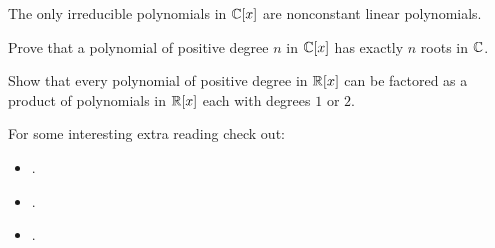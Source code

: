 \documentclass{ximera}
\begin{document}
\begin{corollary}
  The only irreducible polynomials in $\mathbb C[x]$ are nonconstant linear
  polynomials.
\end{corollary}

\begin{exercise} 
Prove that a polynomial of positive degree $n$ in $\mathbb C[x]$ has exactly
$n$ roots in $\mathbb C$.
\end{exercise}


\begin{exercise}\label{E:RQ} 
Show that every polynomial of positive degree in $\mathbb R[x]$ can be
factored as a product of polynomials in $\mathbb R[x]$ each with degrees $1$
or $2$.
\end{exercise}




For some interesting extra reading check out:
\begin{itemize}
\item {}.
\item {}.
\item {}.
\end{itemize}
\end{document}
